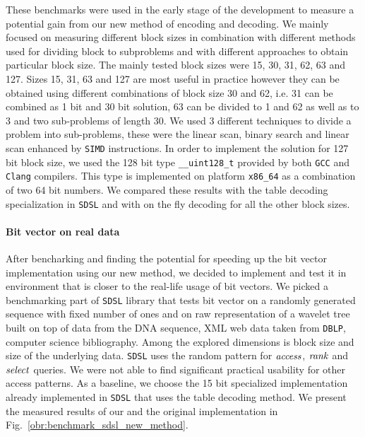 These benchmarks were used in the early stage of the development to measure a potential gain from
our new method of encoding and decoding. We mainly focused on measuring different block sizes
in combination with different methods used for dividing block to subproblems and with different
approaches to obtain particular block size. The mainly tested block sizes were 15, 30, 31, 62, 63
and 127. Sizes 15, 31, 63 and 127 are most useful in practice however they can be obtained using
different combinations of block size 30 and 62, i.e. 31 can be combined as 1 bit and 30 bit solution,
63 can be divided to 1 and 62 as well as to 3 and two sub-problems of length 30.
We used 3 different techniques to divide a problem into sub-problems, these were the linear scan,
binary search and linear scan enhanced by \texttt{SIMD} instructions. In order to implement the
solution for 127 bit block size, we used the 128 bit type \texttt{\_\_uint128\_t} provided by both
\texttt{GCC} and \texttt{Clang} compilers. This type is implemented on platform \texttt{x86\_64}
as a combination of two 64 bit numbers. We compared these results with the table decoding specialization
in \texttt{SDSL} and with on the fly decoding for all the other block sizes. 

\paragraph{Bit vector on real data}

After bencharking and finding the potential for speeding up the bit vector implementation using
our new method, we decided to implement and test it in environment that is closer to the real-life
usage of bit vectors. We picked a benchmarking part of \texttt{SDSL} library that tests bit vector
on a randomly generated sequence with fixed number of ones and on raw representation of a wavelet
tree built on top of data from the DNA sequence, XML web data taken from \texttt{DBLP}, computer
science bibliography. Among the explored dimensions is block size and size of the underlying data.
\texttt{SDSL} uses the random pattern for $\mathit{access}$, $\mathit{rank}$ and $\mathit{select}$ queries. We were not able
to find significant practical usability for other access patterns. As a baseline, we choose the 15
bit specialized implementation already implemented in \texttt{SDSL} that uses the table decoding
method. We present the measured results of our and the original implementation in
Fig.~\ref{obr:benchmark_sdsl_new_method}.

